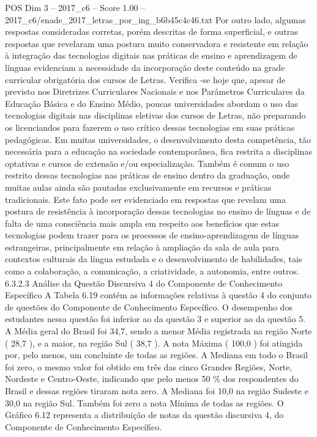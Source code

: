 \begin{textsample}{POS Dim 3 – 2017\_c6 – Score 1.00 – 2017\_c6/enade\_2017\_letras\_por\_ing\_b6b45c4c46.txt}
Por outro lado, algumas respostas consideradas corretas, porém descritas de forma superficial, e outras respostas que revelaram uma postura muito conservadora e resistente em relação à integração das tecnologias digitais nas práticas de ensino e aprendizagem de línguas evidenciam a necessidade da incorporação deste conteúdo na grade curricular obrigatória dos cursos de Letras.
Verifica -se hoje que, apesar de previsto nos Diretrizes Curriculares Nacionais e nos Parâmetros Curriculares da Educação Básica e do Ensino Médio, poucas universidades abordam o uso das tecnologias digitais nas disciplinas eletivas dos cursos de Letras, não preparando os licenciandos para fazerem o uso crítico dessas tecnologias em suas práticas pedagógicas.
Em muitas universidades, o desenvolvimento desta competência, tão necessária para a educação na sociedade contemporânea, fica restrita a disciplinas optativas e cursos de extensão e/ou especialização.
Também é comum o uso restrito dessas tecnologias nas práticas de ensino dentro da graduação, onde muitas aulas ainda são pautadas exclusivamente em recursos e práticas tradicionais.
Este fato pode ser evidenciado em respostas que revelam uma postura de resistência à incorporação dessas tecnologias no ensino de línguas e de falta de uma consciência mais ampla em respeito aos benefícios que estas tecnologias podem trazer para os processos de ensino-aprendizagem de línguas estrangeiras, principalmente em relação à ampliação da sala de aula para contextos culturais da língua estudada e o desenvolvimento de habilidades, tais como a colaboração, a comunicação, a criatividade, a autonomia, entre outros. 6.3.2.3 Análise da Questão Discursiva 4 do Componente de Conhecimento Específico A Tabela 6.19 contém as informações relativas à questão 4 do conjunto de questões do Componente de Conhecimento Específico.
O desempenho dos estudantes nessa questão foi inferior ao da questão 3 e superior ao da questão 5.
A Média geral do Brasil foi 34,7, sendo a menor Média registrada na região Norte ( 28,7 ), e a maior, na região Sul ( 38,7 ).
A nota Máxima ( 100,0 ) foi atingida por, pelo menos, um concluinte de todas as regiões.
A Mediana em todo o Brasil foi zero, o mesmo valor foi obtido em três das cinco Grandes Regiões, Norte, Nordeste e Centro-Oeste, indicando que pelo menos 50 \% dos respondentes do Brasil e dessas regiões tiraram nota zero.
A Mediana foi 10,0 na região Sudeste e 30,0 na região Sul.
Também foi zero a nota Mínima de todas as regiões.
O Gráfico 6.12 representa a distribuição de notas da questão discursiva 4, do Componente de Conhecimento Específico.

\end{textsample}
